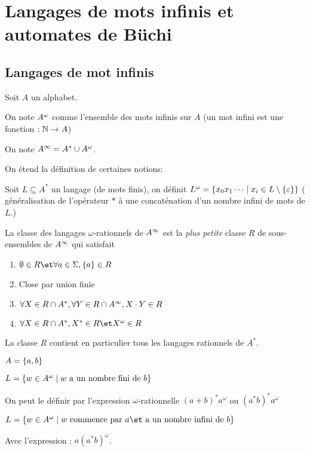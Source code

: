\section{Langages de mots infinis et automates de Büchi}

\subsection{Langages de mot infinis}

\begin{notation}
	Soit $A$ un alphabet.

	On note $A^{\omega}$ comme l'ensemble des mots infinis sur $A$
	(un mot infini est une fonction $: \mathbb{N} \to A$)

	On note $A^{\infty} = A^* \cup A^{\omega}$.

	On étend la définition de certaines notions:

	Soit $L \subseteq A^*$ un langage (de mots finis), on définit
	$L^{\omega} = \left\{x_0x_1\cdots \mid x_i \in L \setminus \left\{\varepsilon\right\}\right\}$
	( généralisation de l'opérateur $*$ à une concaténation d'un nombre infini de mots de $L$.)
\end{notation}


\begin{definition}
	La classe des langages $\omega$-rationnels de $A^{\infty}$ est la \emph{plus petite}
	classe $R$ de sous-ensembles de $A^{\infty}$ qui satisfait
	\begin{enumerate}
		\item $\emptyset \in R \et \forall a \in \Sigma, \set a \in R$
		\item Close par union finie
		\item $\forall X \in R \cap A^*, \forall Y \in R \cap A^{\infty}, X \cdot Y \in R$ \label{omega-clot-fi}
		\item $\forall X \in R \cap A^*, X^* \in R \et X^{\omega} \in R$\label{omega-clot-op}
	\end{enumerate}
\end{definition}

\begin{remarque}
	La classe $R$ contient en particulier tous les langages rationnels de $A^*$.
\end{remarque}

\begin{exemple}
	$A = \left\{a,b\right\}$

	$L = \left\{w \in A^{\omega} \mid w \text{ a un nombre fini de } b\right\}$

	On peut le définir par l'expression $\omega$-rationnelle $(a + b)^* a^{\omega}$ ou $(a^*b)^* a^{\omega}$


	$L = \setdef {w \in \aomega} {w \text{ commence par } a \et \text{ a un nombre infini de } b}$

	Avec l'expression : $a(a^*b)^{\omega}$.
\end{exemple}


